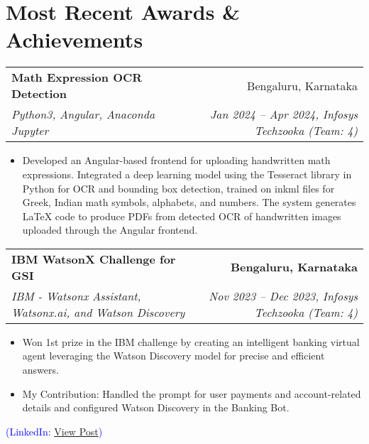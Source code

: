\documentclass[letterpaper,10pt]{article}
\makeatletter
\newcommand{\resumeItem}[1]{
  \item\small{
    {#1 \vspace{-3pt}}
  }
}
\newcommand{\resumeSubheading}[4]{
  \vspace{-2pt}\item
    \begin{tabular*}{0.97\textwidth}[t]{l@{\extracolsep{\fill}}r}
      \textbf{#1} & #2 \\
      \textit{\small#3} & \textit{\small #4} \\
    \end{tabular*}\vspace{-7pt}
}
\newcommand{\resumeSubHeadingListStart}{\begin{itemize}[leftmargin=0.15in, label={}]}
\newcommand{\resumeSubHeadingListEnd}{\end{itemize}}
\newcommand{\resumeItemListStart}{\begin{itemize}}
\newcommand{\resumeItemListEnd}{\end{itemize}\vspace{-5pt}}
\makeatother
\begin{document}
\section{Most Recent Awards \& Achievements}
\vspace{0.1pt}
\resumeSubHeadingListStart
\small{\item{
    \resumeSubheading
      {Math Expression OCR Detection}{Bengaluru, Karnataka}
      {Python3, Angular, Anaconda Jupyter}{Jan 2024 -- Apr 2024, Infosys Techzooka (Team: 4)}
        \resumeItemListStart
            \resumeItem{Developed an Angular-based frontend for uploading handwritten math expressions. Integrated a deep learning model using the Tesseract library in Python for OCR and bounding box detection, trained on inkml files for Greek, Indian math symbols, alphabets, and numbers. The system generates LaTeX code to produce PDFs from detected OCR of handwritten images uploaded through the Angular frontend.}
        \resumeItemListEnd

  \resumeSubheading
  {IBM WatsonX Challenge for GSI}
  {\textbf{Bengaluru, Karnataka}}
  {IBM - Watsonx Assistant, Watsonx.ai, and Watson Discovery}
  {Nov 2023 -- Dec 2023, Infosys Techzooka (Team: 4)}
  \resumeItemListStart
      \resumeItem{Won 1st prize in the IBM challenge by creating an intelligent banking virtual agent leveraging the Watson Discovery model for precise and efficient answers.}
      \resumeItem{My Contribution: Handled the prompt for user payments and account-related details and configured Watson Discovery in the Banking Bot.}
  \resumeItemListEnd
  \vspace{1pt} %
  \small{\textcolor{blue}{(LinkedIn: \href{https://www.linkedin.com/posts/shakthivarman-thangavelu_happy-to-announce-that-i-have-lead-this-young-activity-7132986612459655168-5suN?utm_source=share&utm_medium=member_desktop}{View Post})}}

}}
\resumeSubHeadingListEnd


\end{document}

